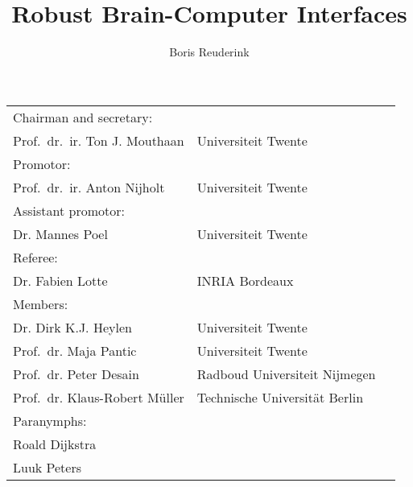\title{Robust Brain-Computer Interfaces}
\author{Boris Reuderink}
\date{}
\maketitle


\noindent\begin{tabular}{@{}l l l}
Chairman and secretary:\\
\hspace{2em}Prof.~dr.~ir. Ton J. Mouthaan & Universiteit Twente\\
Promotor:\\
\hspace{2em}Prof.~dr.~ir. Anton Nijholt & Universiteit Twente\\
Assistant promotor:\\
\hspace{2em}Dr. Mannes Poel & Universiteit Twente\\
Referee:\\
\hspace{2em}Dr. Fabien Lotte & INRIA Bordeaux\\
Members:\\
\hspace{2em}Dr. Dirk K.J. Heylen & Universiteit Twente\\
\hspace{2em}Prof.~dr. Maja Pantic & Universiteit Twente\\
\hspace{2em}Prof.~dr. Peter Desain & Radboud Universiteit Nijmegen\\
\hspace{2em}Prof.~dr. Klaus-Robert M\"uller & Technische Universit\"at Berlin\\
Paranymphs:\\
\hspace{2em}Roald Dijkstra\\
\hspace{2em}Luuk Peters
\end{tabular}

